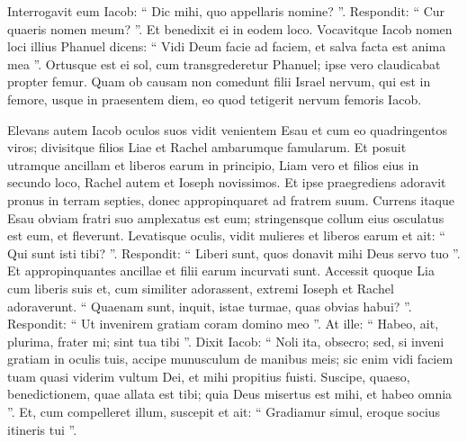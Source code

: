 \begin{biblechapter}
\begin{biblechapter}
\begin{biblechapter}
\begin{biblechapter}
\begin{biblechapter}
\begin{biblechapter}
\begin{biblechapter}
\begin{biblechapter}
\begin{biblechapter}
\begin{biblechapter}
\begin{biblechapter}
\begin{biblechapter}
\begin{biblechapter}
\begin{biblechapter}
\begin{biblechapter}
\begin{biblechapter}
\begin{biblechapter}
\begin{biblechapter}
\begin{biblechapter}
\begin{biblechapter}
\begin{biblechapter}
\begin{biblechapter}
\begin{biblechapter}
\begin{biblechapter}
\begin{biblechapter}
\begin{biblechapter}
\begin{biblechapter}
\begin{biblechapter}
\begin{biblechapter}
\begin{biblechapter}
\begin{biblechapter}
\begin{biblechapter}
\verse Interrogavit eum Iacob: “ Dic mihi, quo appellaris nomine? ”. Respondit: “ Cur quaeris nomen meum? ”. Et benedixit ei in eodem loco. 
\verse Vocavitque Iacob nomen loci illius Phanuel dicens: “ Vidi Deum facie ad faciem, et salva facta est anima mea ”.
 \verse Ortusque est ei sol, cum transgrederetur Phanuel; ipse vero claudicabat propter femur. 
\verse Quam ob causam non comedunt filii Israel nervum, qui est in femore, usque in praesentem diem, eo quod tetigerit nervum femoris Iacob.
 
\begin{biblechapter}
\verse Elevans autem Iacob oculos suos vidit venientem Esau et cum eo quadringentos viros; divisitque filios Liae et Rachel ambarumque famularum. 
 \verse Et posuit utramque ancillam et liberos earum in principio, Liam vero et filios eius in secundo loco, Rachel autem et Ioseph novissimos. 
\verse Et ipse praegrediens adoravit pronus in terram septies, donec appropinquaret ad fratrem suum. 
\verse Currens itaque Esau obviam fratri suo amplexatus est eum; stringensque collum eius osculatus est eum, et fleverunt.
 \verse Levatisque oculis, vidit mulieres et liberos earum et ait: “ Qui sunt isti tibi? ”. Respondit: “ Liberi sunt, quos donavit mihi Deus servo tuo ”. 
\verse Et appropinquantes ancillae et filii earum incurvati sunt. 
\verse Accessit quoque Lia cum liberis suis et, cum similiter adorassent, extremi Ioseph et Rachel adoraverunt.
 \verse “ Quaenam sunt, inquit, istae turmae, quas obvias habui? ”. Respondit: “ Ut invenirem gratiam coram domino meo ”. 
\verse At ille: “ Habeo, ait, plurima, frater mi; sint tua tibi ”. 
\verse Dixit Iacob: “ Noli ita, obsecro; sed, si inveni gratiam in oculis tuis, accipe munusculum de manibus meis; sic enim vidi faciem tuam quasi viderim vultum Dei, et mihi propitius fuisti. 
\verse Suscipe, quaeso, benedictionem, quae allata est tibi; quia Deus misertus est mihi, et habeo omnia ”.
 Et, cum compelleret illum, suscepit 
\verse et ait: “ Gradiamur simul, eroque socius itineris tui ”. 

\end{biblechapter}
\end{biblechapter}
\end{biblechapter}
\end{biblechapter}
\end{biblechapter}
\end{biblechapter}
\end{biblechapter}
\end{biblechapter}
\end{biblechapter}
\end{biblechapter}
\end{biblechapter}
\end{biblechapter}
\end{biblechapter}
\end{biblechapter}
\end{biblechapter}
\end{biblechapter}
\end{biblechapter}
\end{biblechapter}
\end{biblechapter}
\end{biblechapter}
\end{biblechapter}
\end{biblechapter}
\end{biblechapter}
\end{biblechapter}
\end{biblechapter}
\end{biblechapter}
\end{biblechapter}
\end{biblechapter}
\end{biblechapter}
\end{biblechapter}
\end{biblechapter}
\end{biblechapter}
\end{biblechapter}

